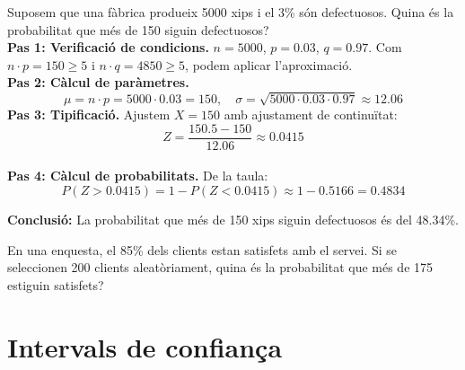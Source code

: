 \documentclass[12pt]{article}
\begin{document}
\begin{exemple} [title=Exemple 2] \noindent 
Suposem que una fàbrica produeix 5000 xips i el 3\% són defectuosos. Quina és la probabilitat que més de 150 siguin defectuosos?\\

\textbf{Pas 1: Verificació de condicions.} $n = 5000$, $p = 0.03$, $q = 0.97$. Com $n \cdot p = 150 \geq 5$ i $n \cdot q = 4850 \geq 5$, podem aplicar l'aproximació.\\

\textbf{Pas 2: Càlcul de paràmetres.}
\[
\mu = n \cdot p = 5000 \cdot 0.03 = 150, \quad \sigma = \sqrt{5000 \cdot 0.03 \cdot 0.97} \approx 12.06
\]
\textbf{Pas 3: Tipificació.} Ajustem $X = 150$ amb ajustament de continuïtat:
\[
Z = \frac{150.5 - 150}{12.06} \approx 0.0415
\]\\

\textbf{Pas 4: Càlcul de probabilitats.} De la taula:
\[
P(Z > 0.0415) = 1 - P(Z < 0.0415) \approx 1 - 0.5166 = 0.4834
\]

\textbf{Conclusió:} La probabilitat que més de 150 xips siguin defectuosos és del 48.34\%.
 \end{exemple}

\begin{exercici} \noindent 
En una enquesta, el 85\% dels clients estan satisfets amb el servei. Si se seleccionen 200 clients aleatòriament, quina és la probabilitat que més de 175 estiguin satisfets?
\end{exercici}

\newpage

\section{Intervals de confiança}
\end{document}

